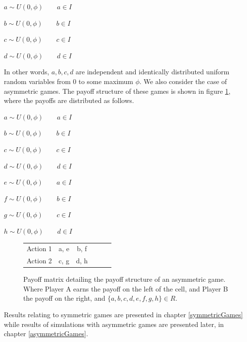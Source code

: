 \documentclass[11pt]{book}
\newcommand*{\np}{\par\noindent\newline}
\begin{document}
\begin{center}\label{a_through_d}	
$a \sim U(0,\phi) \qquad a \in I$

$b \sim U(0,\phi) \qquad b \in I$

$c \sim U(0,\phi) \qquad c \in I$

$d \sim U(0,\phi) \qquad d \in I$
\end{center}

\np In other words, $a, b, c, d$ are independent and identically distributed uniform random variables from $0$ to some maximum $\phi$.
We also consider the case of asymmetric games. The payoff structure of these games is shown in figure \ref{asymmetricGame}, where the payoffs are distributed as follows.
\begin{center}\label{a_through_d}	
	$a \sim U(0,\phi) \qquad a \in I$
	
	$b \sim U(0,\phi) \qquad b \in I$
	
	$c \sim U(0,\phi) \qquad c \in I$
	
	$d \sim U(0,\phi) \qquad d \in I$

	$e \sim U(0,\phi) \qquad a \in I$
	
	$f \sim U(0,\phi) \qquad b \in I$
	
	$g \sim U(0,\phi) \qquad c \in I$
	
	$h \sim U(0,\phi) \qquad d \in I$
\end{center}

\begin{figure}[H]
	\vspace{30px}
	\centering
	\begin{tabular}{|l||*{5}{c|}}\hline
		\backslashbox{Player A}{Player B}
		&\makebox[7em]{Action 1}&\makebox[7em]{Action 2}\\\hline\hline
		Action 1 & a, e & b, f\\\hline
		Action 2 & c, g & d, h \\\hline
	\end{tabular}
	\caption{Payoff matrix detailing the payoff structure of an asymmetric game. Where Player A earns the payoff on the left of the cell, and Player B the payoff on the right, and $\{a, b, c, d, e, f, g, h\} \in R$.}
	\label{asymmetricGame}
	\vspace{20px}
\end{figure}

\np Results relating to symmetric games are presented in chapter \ref{symmetricGames}
while results of simulations with asymmetric games are presented later, in chapter \ref{asymmetricGames}.
\end{document}
